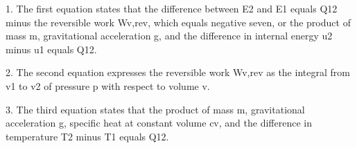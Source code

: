 1. The first equation states that the difference between E2 and E1 equals Q12 minus the reversible work Wv,rev, which equals negative seven, or the product of mass m, gravitational acceleration g, and the difference in internal energy u2 minus u1 equals Q12.

2. The second equation expresses the reversible work Wv,rev as the integral from v1 to v2 of pressure p with respect to volume v.

3. The third equation states that the product of mass m, gravitational acceleration g, specific heat at constant volume cv, and the difference in temperature T2 minus T1 equals Q12.